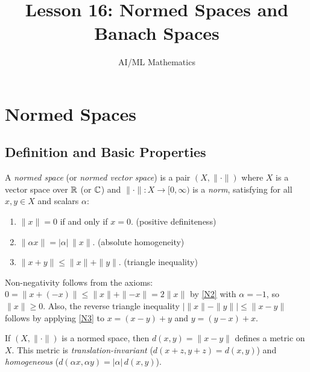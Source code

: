 \documentclass[11pt,a4paper]{article}
\title{Lesson 16: Normed Spaces and Banach Spaces}
\author{AI/ML Mathematics}
\date{}
\begin{document}
\maketitle
\tableofcontents
\newpage


\section{Normed Spaces}
\label{sec:normed}

\subsection{Definition and Basic Properties}
\label{subsec:norm_def}

\begin{definition}
\label{def:normed}
A \emph{normed space} (or \emph{normed vector space}) is a pair $(X, \|\cdot\|)$
where $X$ is a vector space over $\mathbb{R}$ (or $\mathbb{C}$) and
$\|\cdot\| \colon X \to [0,\infty)$ is a \emph{norm}, satisfying for all
$x, y \in X$ and scalars $\alpha$:
\begin{enumerate}[nosep,label=(N\arabic*)]
  \item \label{N1} $\|x\| = 0$ if and only if $x = 0$.
    \hfill (positive definiteness)
  \item \label{N2} $\|\alpha x\| = |\alpha| \, \|x\|$.
    \hfill (absolute homogeneity)
  \item \label{N3} $\|x + y\| \le \|x\| + \|y\|$.
    \hfill (triangle inequality)
\end{enumerate}
\end{definition}

\begin{remark}
Non-negativity follows from the axioms: $0 = \|x + (-x)\| \le \|x\| +
\|{-x}\| = 2\|x\|$ by \ref{N2} with $\alpha = -1$, so $\|x\| \ge 0$. Also,
the reverse triangle inequality $|\|x\| - \|y\|| \le \|x - y\|$ follows by
applying \ref{N3} to $x = (x-y) + y$ and $y = (y-x) + x$.
\end{remark}

\begin{proposition}
\label{prop:norm_metric}
If $(X, \|\cdot\|)$ is a normed space, then $d(x,y) = \|x - y\|$ defines a
metric on $X$. This metric is \emph{translation-invariant}
($d(x+z, y+z) = d(x,y)$) and \emph{homogeneous}
($d(\alpha x, \alpha y) = |\alpha|\, d(x,y)$).
\end{proposition}
\end{document}
